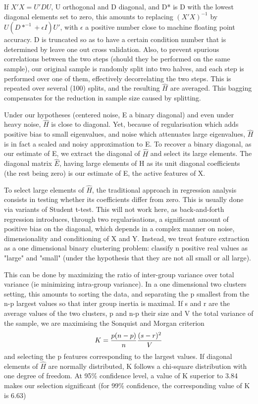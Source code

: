 \documentclass{article}
\begin{document}
If $X'X=U'DU$, U orthogonal and D diagonal, and D* is D with the lowest diagonal elements set to zero, this amounts to replacing $(X'X)^{-1}$ by $U(D*^{-1}+\epsilon I)U'$, with $\epsilon$ a positive number close to machine floating point accuracy. D is truncated so as to have a certain condition number that is determined by leave one out cross validation.
%
Also, to prevent spurious correlations between the two steps (should they be performed on the same sample), our original sample is randomly split into two halves, and each step is performed over one of them, effectively decorrelating the two steps.
%
This is repeated over several (100) splits, and the resulting $\hat H$ are averaged.
%
This bagging compensates for the reduction in sample size caused by splitting.

Under our hypotheses (centered noise, E a binary diagonal) and even under heavy noise, $\hat H$ is close to diagonal.
%
Yet, because of regularisation which adds positive bias to small eigenvalues, and noise which attenuates large eigenvalues, $\hat H$ is in fact a scaled and noisy approximation to E.
%
To recover a binary diagonal, as our estimate of E, we extract the diagonal of $\hat H$ and select its large elements.
%
The diagonal matrix $\hat E$, having large elements of H as its unit diagonal coefficients (the rest being zero) is our estimate of E, the active features of X.

To select large elements of $\hat H$, the traditional approach in regression analysis consists in testing whether its coefficients differ from zero. This is usually done via variants of Student t-test.
%
This will not work here, as back-and-forth regression introduces, through two regularisations, a significant amount of positive bias on the diagonal, which depends in a complex manner on noise, dimensionality and conditioning of X and Y.
%
Instead, we treat feature extraction as a one dimensional binary clustering problem: classify n positive real values as "large" and "small" (under the hypothesis that they are not all small or all large).

This can be done by maximizing the ratio of inter-group variance over total variance (ie minimizing intra-group variance).
%
In a one dimensional two clusters setting, this amounts to sorting the data, and separating the p smallest from the n-p largest values so that inter group inertia is maximal.
%
If s and r are the average values of the two clusters, p and n-p their size and V the total variance of the sample, we are maximising the Sonquist and Morgan criterion $$K = {p (n-p) \over n} {(s-r)^2 \over V}$$ and selecting the p features corresponding to the largest values.
%
If diagonal elements of $\hat H$ are normally distributed, K follows a chi-square distribution with one degree of freedom.
%
At 95\% confidence level, a value of K superior to 3.84 makes our selection significant (for 99\% confidence, the corresponding value of K is 6.63) \citep{Kass_75}
\end{document}
